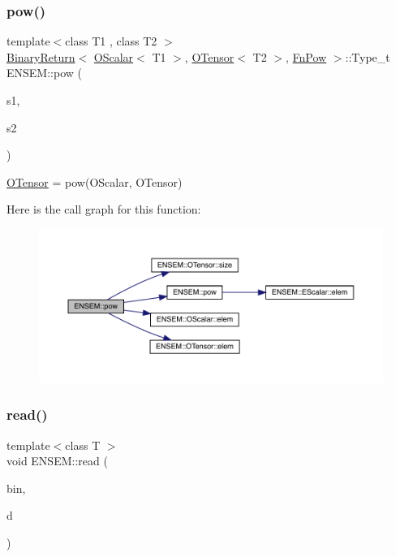 \subsubsection{\texorpdfstring{pow()}{pow()}\hspace{0.1cm}{\footnotesize\ttfamily [3/3]}}
{\footnotesize\ttfamily template$<$class T1 , class T2 $>$ \\
\mbox{\hyperlink{structENSEM_1_1BinaryReturn}{Binary\+Return}}$<$ \mbox{\hyperlink{classENSEM_1_1OScalar}{O\+Scalar}}$<$ T1 $>$, \mbox{\hyperlink{classENSEM_1_1OTensor}{O\+Tensor}}$<$ T2 $>$, \mbox{\hyperlink{structENSEM_1_1FnPow}{Fn\+Pow}} $>$\+::Type\+\_\+t E\+N\+S\+E\+M\+::pow (\begin{DoxyParamCaption}\item[{const \mbox{\hyperlink{classENSEM_1_1OScalar}{O\+Scalar}}$<$ T1 $>$ \&}]{s1,  }\item[{const \mbox{\hyperlink{classENSEM_1_1OTensor}{O\+Tensor}}$<$ T2 $>$ \&}]{s2 }\end{DoxyParamCaption})\hspace{0.3cm}{\ttfamily [inline]}}



\mbox{\hyperlink{classENSEM_1_1OTensor}{O\+Tensor}} = pow(\+O\+Scalar, O\+Tensor) 

Here is the call graph for this function\+:\nopagebreak
\begin{figure}[H]
\begin{center}
\leavevmode
\includegraphics[width=350pt]{de/d87/group__obstensor_ga5f02683bb668851c7df8a84ba438b0fb_cgraph}
\end{center}
\end{figure}
\mbox{\label{group__obstensor_ga99e7dbdd85834a965f5483165945d05a}} 
\subsubsection{\texorpdfstring{read()}{read()}}
{\footnotesize\ttfamily template$<$class T $>$ \\
void E\+N\+S\+E\+M\+::read (\begin{DoxyParamCaption}\item[{\mbox{\hyperlink{classADATIO_1_1BinaryReader}{A\+D\+A\+T\+I\+O\+::\+Binary\+Reader}} \&}]{bin,  }\item[{\mbox{\hyperlink{classENSEM_1_1OTensor}{O\+Tensor}}$<$ T $>$ \&}]{d }\end{DoxyParamCaption})\hspace{0.3cm}{\ttfamily [inline]}}



